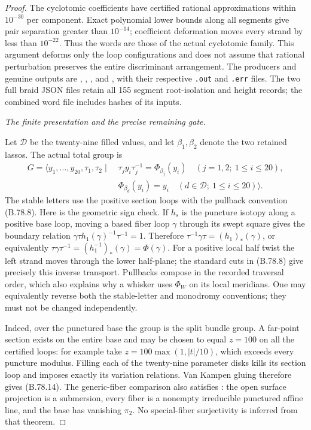 \begin{proof}
The cyclotomic coefficients have certified rational approximations
within \(10^{-30}\) per component. Exact polynomial lower bounds along
all segments give pair separation greater than \(10^{-14}\); coefficient
deformation moves every strand by less than \(10^{-22}\). Thus the
words are those of the actual cyclotomic family. This argument deforms
only the loop configurations and does not assume that rational
perturbation preserves the entire discriminant arrangement.
The producers and genuine outputs are
,
,
, and
,
with their respective \texttt{.out} and \texttt{.err} files. The two
full braid JSON files retain all 155 segment root-isolation and height
records; the combined word file includes hashes of its inputs.

\emph{The finite presentation and the precise remaining gate.}\par
Let \(\mathscr D\) be the twenty-nine filled values, and let
\(\beta_1,\beta_2\) denote the two retained lassos. The actual total
group is
\[
\begin{split}
G=\langle y_1,\ldots,y_{20},\tau_1,\tau_2\mid\;&
 \tau_jy_i\tau_j^{-1}=\Phi_{\beta_j}(y_i)
                   \quad(j=1,2;\ 1\leq i\leq20),\\
 &\Phi_{\beta_d}(y_i)=y_i
                   \quad(d\in\mathscr D;\ 1\leq i\leq20)\rangle.
\end{split}
 \tag{B.78.14}
\]
The stable letters use the positive section loops with the pullback
convention (B.78.8). Here is the geometric sign check. If \(h_s\) is
the puncture isotopy along a positive base loop, moving a based fiber
loop \(\gamma\) through its swept square gives the boundary relation
\(\gamma\tau h_1(\gamma)^{-1}\tau^{-1}=1\). Therefore
\(\tau^{-1}\gamma\tau=(h_1)_*(\gamma)\), or equivalently
\(\tau\gamma\tau^{-1}=(h_1^{-1})_*(\gamma)=\Phi(\gamma)\).
For a positive local half twist the left strand moves through the lower
half-plane; the standard cuts in (B.78.8) give precisely this inverse
transport. Pullbacks compose in the recorded traversal order, which
also explains why a whisker uses \(\Phi_W\) on its local meridians.
One may equivalently reverse both the stable-letter and monodromy
conventions; they must not be changed independently.

Indeed, over the punctured base the group is the split bundle group.
A far-point section exists on the entire base and may be chosen to
equal \(z=100\) on all the certified loops: for example take
\(z=100\max(1,|t|/10)\), which exceeds every puncture modulus.
Filling each of the twenty-nine parameter disks kills its section
loop and imposes exactly its variation relations. Van Kampen gluing
therefore gives (B.78.14). The generic-fiber comparison also satisfies
\citet[Corollary~1.1 and Remark~1.2]{DE_Shimada2010}: the open surface
projection is a submersion, every fiber is a nonempty irreducible
punctured affine line, and the base has vanishing \(\pi_2\).
No special-fiber surjectivity is inferred from that theorem.


\end{proof}
